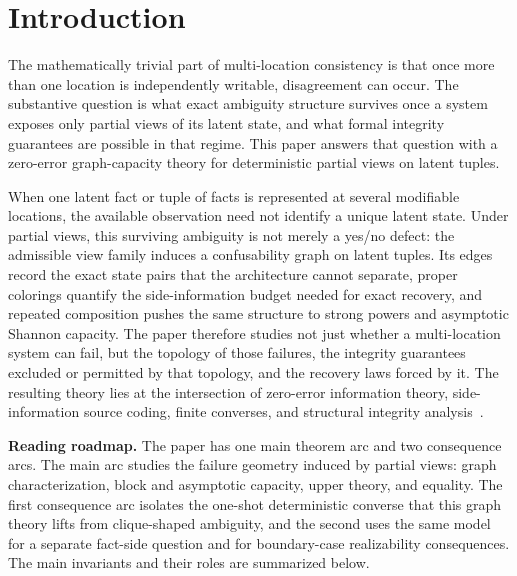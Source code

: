 \section{Introduction}\label{introduction}

The mathematically trivial part of multi-location consistency is that once more than one location is independently writable, disagreement can occur. The substantive question is what exact ambiguity structure survives once a system exposes only partial views of its latent state, and what formal integrity guarantees are possible in that regime. This paper answers that question with a zero-error graph-capacity theory for deterministic partial views on latent tuples.

When one latent fact or tuple of facts is represented at several modifiable locations, the available observation need not identify a unique latent state. Under partial views, this surviving ambiguity is not merely a yes/no defect: the admissible view family induces a confusability graph on latent tuples. Its edges record the exact state pairs that the architecture cannot separate, proper colorings quantify the side-information budget needed for exact recovery, and repeated composition pushes the same structure to strong powers and asymptotic Shannon capacity. The paper therefore studies not just whether a multi-location system can fail, but the topology of those failures, the integrity guarantees excluded or permitted by that topology, and the recovery laws forced by it. The resulting theory lies at the intersection of zero-error information theory, side-information source coding, finite converses, and structural integrity analysis~\cite{shannon1956zero,korner1973graphs,lovasz1979shannon,witsenhausen1976zero,slepian1973noiseless,cover2006elements}.

\medskip
\noindent\textbf{Reading roadmap.} The paper has one main theorem arc and two consequence arcs. The main arc studies the failure geometry induced by partial views: graph characterization, block and asymptotic capacity, upper theory, and equality. The first consequence arc isolates the one-shot deterministic converse that this graph theory lifts from clique-shaped ambiguity, and the second uses the same model for a separate fact-side question and for boundary-case realizability consequences. The main invariants and their roles are summarized below.

